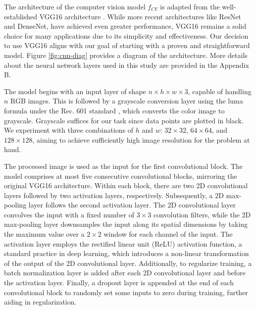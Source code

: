 \documentclass[]{interact}
\theoremstyle{plain}%
\theoremstyle{definition}
\theoremstyle{remark}
\begin{document}
The architecture of the computer vision model \(f_{CV}\) is adapted from
the well-established VGG16 architecture \citep{simonyan2014very}. While
more recent architectures like ResNet \citep{he2016deep} and
DenseNet\citep{huang2017densely}, have achieved even greater
performance, VGG16 remains a solid choice for many applications due to
its simplicity and effectiveness. Our decision to use VGG16 aligns with
our goal of starting with a proven and straightforward model. Figure
\ref{fig:cnn-diag} provides a diagram of the architecture. More details
about the neural network layers used in this study are provided in the
Appendix B.

The model begins with an input layer of shape
\(n \times h \times w \times 3\), capable of handling \(n\) RGB images.
This is followed by a grayscale conversion layer using the luma formula
under the Rec. 601 standard \citep{series2011studio}, which converts the
color image to grayscale. Grayscale suffices for our task since data
points are plotted in black. We experiment with three combinations of
\(h\) and \(w\): \(32 \times 32\), \(64 \times 64\), and
\(128 \times 128\), aiming to achieve sufficiently high image resolution
for the problem at hand.

The processed image is used as the input for the first convolutional
block. The model comprises at most five consecutive convolutional
blocks, mirroring the original VGG16 architecture. Within each block,
there are two 2D convolutional layers followed by two activation layers,
respectively. Subsequently, a 2D max-pooling layer follows the second
activation layer. The 2D convolutional layer convolves the input with a
fixed number of \(3 \times 3\) convolution filters, while the 2D
max-pooling layer downsamples the input along its spatial dimensions by
taking the maximum value over a \(2 \times 2\) window for each channel
of the input. The activation layer employs the rectified linear unit
(ReLU) activation function, a standard practice in deep learning, which
introduces a non-linear transformation of the output of the 2D
convolutional layer. Additionally, to regularize training, a batch
normalization layer is added after each 2D convolutional layer and
before the activation layer. Finally, a dropout layer is appended at the
end of each convolutional block to randomly set some inputs to zero
during training, further aiding in regularization.
\end{document}
